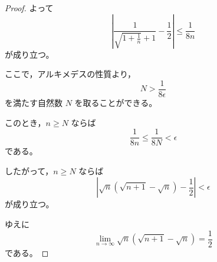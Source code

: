 \begin{proof}
    よって
    \[
        \left|
            \frac{1}{\sqrt{1+\frac{1}{n}}+1}
            -
            \frac{1}{2}
        \right|
        \leq
        \frac{1}{8n}
    \]
    が成り立つ。

    ここで，アルキメデスの性質より，
    \[
        N>\frac{1}{8\epsilon}
    \]
    を満たす自然数 $N$ を取ることができる。

    このとき，$n\geq N$ ならば
    \[
        \frac{1}{8n}
        \leq
        \frac{1}{8N}
        <
        \epsilon
    \]
    である。

    したがって，$n\geq N$ ならば
    \[
        \left|
            \sqrt{n}\left(\sqrt{n+1}-\sqrt{n}\right)
            -
            \frac{1}{2}
        \right|
        <
        \epsilon
    \]
    が成り立つ。

    ゆえに
    \[
        \lim_{n\to\infty}
        \sqrt{n}\left(\sqrt{n+1}-\sqrt{n}\right)
        =
        \frac{1}{2}
    \]
    である。
\end{proof}